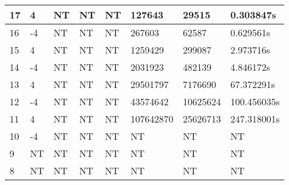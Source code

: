 \documentclass{article}
\begin{document}
\begin{table}[ht]
\begin{tabular}{|l|l|l|l|l|l|l|l|}
17    & 4              & NT              & NT            & NT              & 127643          & 29515         & 0.303847s  \\ \hline
16    & -4             & NT              & NT            & NT              & 267603          & 62587         & 0.629561s  \\ \hline
15    & 4              & NT              & NT            & NT              & 1259429         & 299087        & 2.973716s  \\ \hline
14    & -4             & NT              & NT            & NT              & 2031923         & 482139        & 4.846172s  \\ \hline
13    & 4              & NT              & NT            & NT              & 29501797        & 7176690       & 67.372291s \\ \hline
12    & -4             & NT              & NT            & NT              & 43574642        & 10625624      & 100.456035s\\ \hline
11    & 4              & NT              & NT            & NT              & 107642870       & 25626713      & 247.318001s\\ \hline
10    & -4             & NT              & NT            & NT              & NT              & NT            & NT              \\ \hline
9    & NT             & NT              & NT            & NT              & NT              & NT            & NT              \\ \hline
8    & NT             & NT              & NT            & NT              & NT              & NT            & NT              \\ \hline
\end{tabular}
\end{table}
\end{document}
